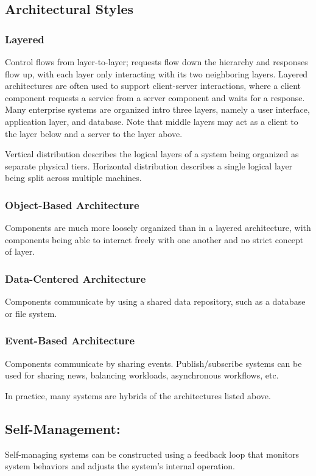 \documentclass[12pt,titlepage]{article}
\begin{document}
    \subsection{Architectural Styles}
      \subsubsection{Layered}
        Control flows from layer-to-layer; requests flow down the hierarchy and responses flow up, with each layer only interacting with its two neighboring layers.
        Layered architectures are often used to support client-server interactions, where a client component requests a service from a server component and waits for
        a response. Many enterprise systems are organized intro three layers, namely a user interface, application layer, and database. Note that middle layers may
        act as a client to the layer below and a server to the layer above.

        Vertical distribution describes the logical layers of a system being organized as separate physical tiers.  Horizontal distribution describes a single logical
        layer being split across multiple machines.

      \subsubsection{Object-Based Architecture}
        Components are much more loosely organized than in a layered architecture, with components being able to interact freely with one another and no strict concept
        of layer.

      \subsubsection{Data-Centered Architecture}
        Components communicate by using a shared data repository, such as a database or file system.

      \subsubsection{Event-Based Architecture}
        Components communicate by sharing events. Publish/subscribe systems can be used for sharing news, balancing workloads, asynchronous workflows, etc.        

      In practice, many systems are hybrids of the architectures listed above.

    \subsection{Self-Management:}
      Self-managing systems can be constructed using a feedback loop that monitors system behaviors and adjusts the system's internal operation.
\end{document}
